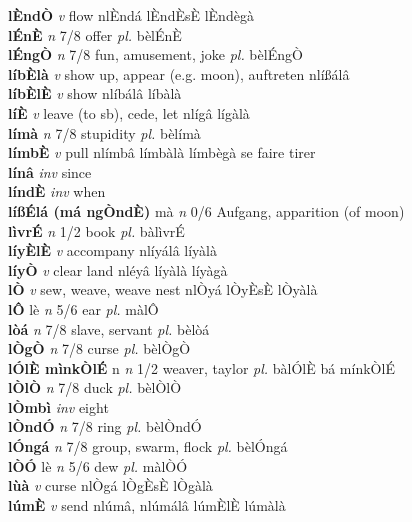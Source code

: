 \documentclass{article}
\begin{document}
{\bf lÈndÒ}  {\it v} flow   nlÈndá  lÈndÈsÈ  lÈndègà  \\ 
{\bf lÉnÈ}  {\it n} 7/8 offer {\it pl.} bèlÉnÈ         \\ 
{\bf lÉngÒ}  {\it n} 7/8 fun, amusement, joke {\it pl.} bèlÉngÒ         \\ 
{\bf líbÈlà}  {\it v} show up, appear (e.g. moon), auftreten   nlíßálâ      \\ 
{\bf líbÈlÈ}  {\it v} show   nlíbálâ   líbàlà   \\ 
{\bf líÈ}  {\it v} leave (to sb), cede, let   nlígâ   lígàlà   \\ 
{\bf límà}  {\it n} 7/8 stupidity {\it pl.} bèlímà         \\ 
{\bf límbÈ}  {\it v} pull   nlímbâ   límbàlà límbègà se faire tirer  \\ 
{\bf línâ}  {\it inv} since         \\ 
{\bf líndÈ}  {\it inv} when         \\ 
{\bf líßÉlá (má ngÒndÈ)} mà {\it n} 0/6 Aufgang, apparition (of moon)         \\ 
{\bf lìvrÉ}  {\it n} 1/2 book {\it pl.} bàlìvrÉ         \\ 
{\bf líyÈlÈ}  {\it v} accompany   nlíyálâ   líyàlà   \\ 
{\bf líyÒ}  {\it v} clear land   nléyâ   líyàlà líyàgà  \\ 
{\bf lÒ}  {\it v} sew, weave, weave nest   nlÒyá  lÒyÈsÈ lÒyàlà   \\ 
{\bf lÔ} lè {\it n} 5/6 ear {\it pl.} màlÔ         \\ 
{\bf lòá}  {\it n} 7/8 slave, servant {\it pl.} bèlòá         \\ 
{\bf lÒgÒ}  {\it n} 7/8 curse {\it pl.} bèlÒgÒ         \\ 
{\bf lÓlÈ mìnkÒlÉ} n {\it n} 1/2 weaver, taylor {\it pl.} bàlÓlÈ bá mínkÒlÉ         \\ 
{\bf lÒlÒ}  {\it n} 7/8 duck {\it pl.} bèlÒlÒ         \\ 
{\bf lÒmbì}  {\it inv} eight         \\ 
{\bf lÒndÓ}  {\it n} 7/8 ring {\it pl.} bèlÒndÓ         \\ 
{\bf lÓngá}  {\it n} 7/8 group, swarm, flock {\it pl.} bèlÓngá         \\ 
{\bf lÒÓ} lè {\it n} 5/6 dew {\it pl.} màlÒÓ         \\ 
{\bf lùà}  {\it v} curse   nlÒgá  lÒgÈsÈ lÒgàlà   \\ 
{\bf lúmÈ}  {\it v} send   nlúmâ, nlúmálâ lúmÈlÈ  lúmàlà   \\ 
\end{document}
